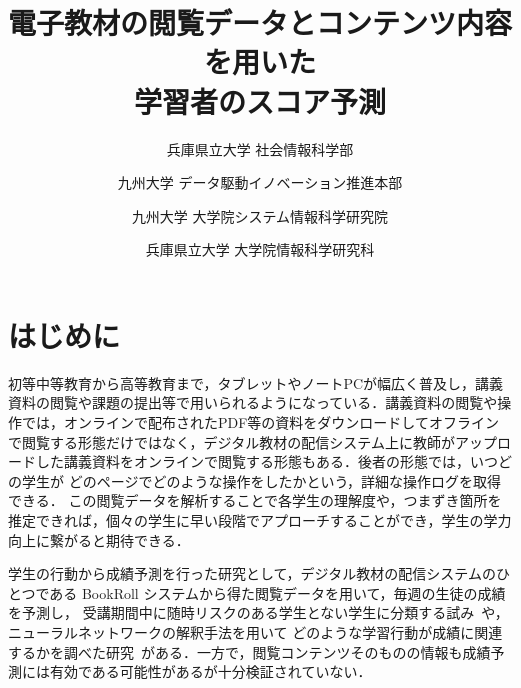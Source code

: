 \documentclass[platex,dvipdfmx,a4paper,twocolumn,base=10pt,jbase=10pt,ja=standard]{bxjsarticle}
\title{\Large\bf 電子教材の閲覧データとコンテンツ内容を用いた\\学習者のスコア予測}{\bf Predicting learner scores using browsing data and content of electronic learning materials}
\author{兵庫県立大学 社会情報科学部}{小岸 沙也加}{Sayaka Kogishi, University of Hyogo}
\author{九州大学 データ駆動イノベーション推進本部}{峰松 翼}{Tsubasa Minematsu, Kyushu University}
\author{九州大学 大学院システム情報科学研究院}{島田 敬士}{Atsushi Shimada, Kyushu University}
\author{兵庫県立大学 大学院情報科学研究科}{川嶋 宏彰}{Hiroaki Kawashima, University of Hyogo}
\begin{document}
\maketitle

\section{はじめに}
\label{sec:intro}
    
初等中等教育から高等教育まで，タブレットやノートPCが幅広く普及し，講義資料の閲覧や課題の提出等で用いられるようになっている．講義資料の閲覧や操作では，オンラインで配布されたPDF等の資料をダウンロードしてオフラインで閲覧する形態だけではなく，デジタル教材の配信システム上に教師がアップロードした講義資料をオンラインで閲覧する形態もある．後者の形態では，いつどの学生が
どのページでどのような操作をしたかという，詳細な操作ログを取得できる．
この閲覧データを解析することで各学生の理解度や，つまずき箇所を推定できれば，個々の学生に早い段階でアプローチすることができ，学生の学力向上に繋がると期待できる．



学生の行動から成績予測を行った研究として，デジタル教材の配信システムのひとつである BookRoll システムから得た閲覧データを用いて，毎週の生徒の成績を予測し，
受講期間中に随時リスクのある学生とない学生に分類する試み~\cite{Predictionstudentperformance2022}や，
ニューラルネットワークの解釈手法を用いて
どのような学習行動が成績に関連するかを調べた研究~\cite{BR12020}がある．一方で，閲覧コンテンツそのものの情報も成績予測には有効である可能性があるが十分検証されていない．
\end{document}
